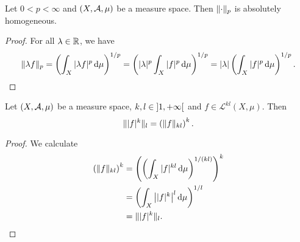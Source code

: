 \begin{lemma} \label{pNormAbsolutelyHomogeneous}
Let $0< p<\infty$ and $\sSet{X,\mathcal{A},\mu}$ be a measure space. Then $\lVert\cdot\rVert_p$ is absolutely homogeneous.
\end{lemma}
\begin{proof}
For all $\lambda\in \mathbb{R}$, we have
\[ \lVert\lambda f\rVert_{p} = \left(\int_X |\lambda f|^p\operatorname{d \!}{\mu}\right)^{1/p} = \left(|\lambda|^p\int_X |f|^p\operatorname{d \!}{\mu}\right)^{1/p} = |\lambda|\left(\int_X |f|^p\operatorname{d \!}{\mu}\right)^{1/p}. \]
\end{proof}

\begin{lemma} \label{pnormLemma}
Let $\sSet{X,\mathcal{A},\mu}$ be a measure space, $k,l\in\interval[o]{1,+\infty}$ and $f\in \mathcal{L}^{kl}(X,\mu)$. Then
\[ \lVert|f|^k\rVert_l = \left(\lVert f\rVert_{kl}\right)^k. \]
\end{lemma}
\begin{proof}
We calculate
\begin{align*}
\left(\lVert f\rVert_{kl}\right)^k &= \left(\left(\int_X|f|^{kl}\operatorname{d \!}{\mu}\right)^{1/(kl)}\right)^{k} \\
&= \left(\int_X\big||f|^{k}\big|^l\operatorname{d \!}{\mu}\right)^{1/l} \\
&= \lVert|f|^k\rVert_l.
\end{align*}
\end{proof}

